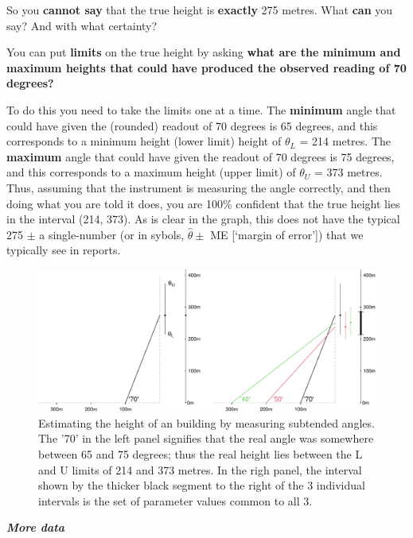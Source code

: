 \documentclass[
]{article}
\begin{document}
So you \textbf{cannot say} that the true height is \textbf{exactly} 275
metres. What \textbf{can} you say? And with what certainty?

You can put \textbf{limits} on the true height by asking \textbf{what
are the minimum and maximum heights that could have produced the
observed reading of 70 degrees?}

To do this you need to take the limits one at a time. The
\textbf{minimum} angle that could have given the (rounded) readout of 70
degrees is 65 degrees, and this corresponds to a minimum height (lower
limit) height of \(\theta_L\) = 214 metres. The \textbf{maximum} angle
that could have given the readout of 70 degrees is 75 degrees, and this
corresponds to a maximum height (upper limit) of \(\theta_U\) = 373
metres. Thus, assuming that the instrument is measuring the angle
correctly, and then doing what you are told it does, you are 100\%
confident that the true height lies in the interval (214, 373). As is
clear in the graph, this does not have the typical 275 \(\pm\) a
single-number (or in sybols, \(\hat{\theta} \pm\) ME {[}`margin of
error'{]}) that we typically see in reports.

\begin{figure}

{\centering \includegraphics{hanley-ci_files/figure-latex/unnamed-chunk-1-1} 

}

\caption{Estimating the height of an building by measuring subtended angles. The '70' in the left panel signifies that the real angle was somewhere between 65 and 75 degrees; thus the real height lies between the L and U limits of 214 and 373 metres. In the righ panel, the  interval shown by the thicker black segment to the right of the 3 individual intervals is the  set of parameter values common to all 3.}\label{fig:unnamed-chunk-1}
\end{figure}

\textbf{\emph{More data}}
\end{document}

